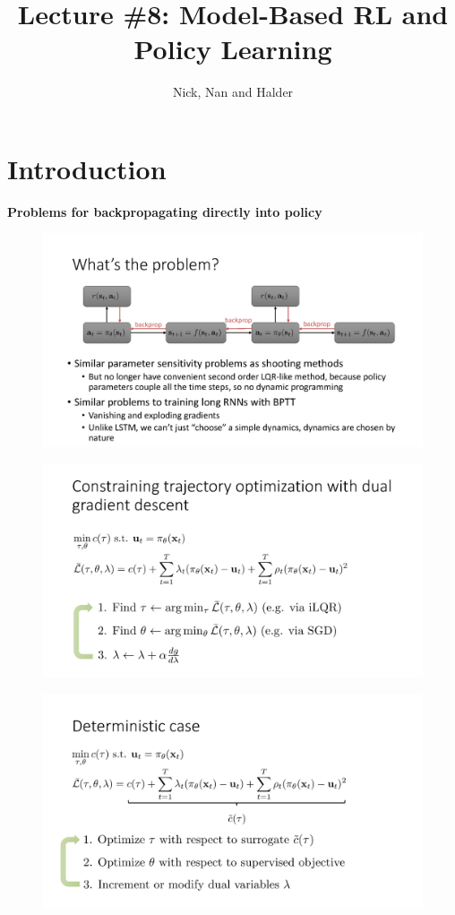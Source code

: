 \documentclass{article}
\title{Lecture \#8: Model-Based RL and Policy Learning}
\author{
  Nick, Nan and Halder 
}
\begin{document}
\maketitle


\section{Introduction}

\noindent\textbf{Problems for backpropagating directly into policy} 

\begin{figure}[H]
    \centering
        \includegraphics[width=0.8\linewidth]{img/whats_the_problem.png}
\end{figure}

\begin{figure}[H]
    \centering
        \includegraphics[width=0.8\linewidth]{img/dual_gradient.png}
\end{figure}

\begin{figure}[H]
    \centering
        \includegraphics[width=0.8\linewidth]{img/determinstic_case.png}
\end{figure}
\end{document}
